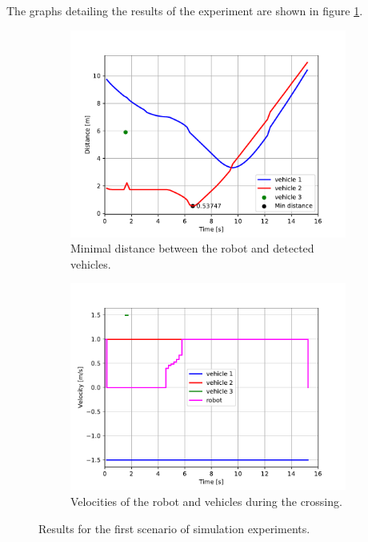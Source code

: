             The graphs detailing the results of the experiment are shown in figure \ref{fig:scene1_graphs}.
            \begin{figure}[H]
                \centering
                \begin{subfigure}{0.49\linewidth}
                    \centering
                    \includegraphics[trim={13 8 40 41}, clip, width=\linewidth]{images/simulations/scene1_dist.pdf}
                    \caption{Minimal distance between the robot and detected vehicles.}
                \end{subfigure}
                \begin{subfigure}{0.49\linewidth}
                    \centering
                    \includegraphics[trim={13 8 40 41}, clip, width=\linewidth]{images/simulations/scene1_vel.pdf}
                    \caption{Velocities of the robot and vehicles during the crossing.}
                \end{subfigure}
                \caption{Results for the first scenario of simulation experiments.}
                \label{fig:scene1_graphs}
            \end{figure}
